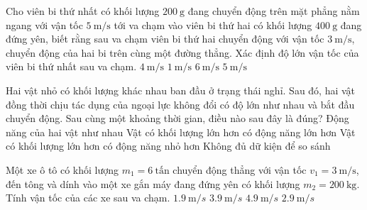 \begin{ex}
	Cho viên bi thứ nhất có khối lượng $\SI{200}{\gram}$ đang chuyển động trên mặt phẳng nằm ngang với vận tốc $\SI{5}{\meter/\second}$ tới va chạm vào viên bi thứ hai có khối lượng $\SI{400}{\gram}$ đang đứng yên, biết rằng sau va chạm viên bi thứ hai chuyển động với vận tốc $\SI{3}{\meter/\second}$, chuyển động của hai bi trên cùng một đường thẳng. Xác định độ lớn vận tốc của viên bi thứ nhất sau va chạm.
	\choice
	{$\SI{4}{\meter/\second}$}
	{\True $\SI{1}{\meter/\second}$}
	{$\SI{6}{\meter/\second}$}
	{$\SI{5}{\meter/\second}$}
\end{ex}
\begin{ex}
	Hai vật nhỏ có khối lượng khác nhau ban đầu ở trạng thái nghỉ. Sau đó, hai vật đồng thời chịu tác dụng của ngoại lực không đổi có độ lớn như nhau và bắt đầu chuyển động. Sau cùng một khoảng thời gian, điều nào sau đây là đúng?
	\choice
	{Động năng của hai vật như nhau}
	{Vật có khối lượng lớn hơn có động năng lớn hơn}
	{\True Vật có khối lượng lớn hơn có động năng nhỏ hơn}
	{Không đủ dữ kiện để so sánh}
\end{ex}
\begin{ex}
Một xe ô tô có khối lượng $m_1 = 6\ \text{tấn}$ chuyển động thẳng với vận tốc $v_1=3\ \text{m/s}$, đến tông và dính vào một xe gắn máy đang đứng yên có khối lượng $m_2 = 200\ \text{kg}$. Tính vận tốc của các xe sau va chạm.	
	\choice
	{$\SI{1.9}{\meter/s}$}
	{$\SI{3.9}{\meter/s}$}
	{$\SI{4.9}{\meter/s}$}
	{\True $\SI{2.9}{\meter/s}$}
\end{ex}
